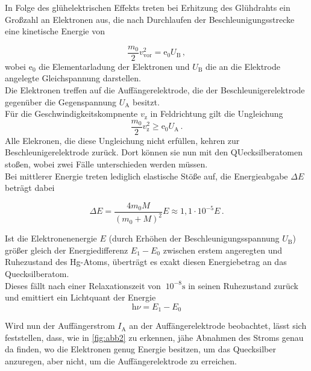 In Folge des glühelektrischen Effekts treten bei Erhitzung des Glühdrahts
ein Großzahl an Elektronen aus, die nach Durchlaufen der Beschleunigungsstrecke
eine kinetische Energie von

\begin{equation*}
    \dfrac{m_0}{2} v^2_\text{vor} = \text{e}_0 U_\text{B} \,,
\end{equation*}
wobei $\text{e}_0$ die Elementarladung der Elektronen und $U_\text{B}$
die an die Elektrode angelegte Gleichspannung darstellen. \\

Die Elektronen treffen auf die Auffängerelektrode, die der Beschleunigerelektrode gegenüber
die Gegenspannung $U_\text{A}$ besitzt. \\

Für die Geschwindigkeitskompnente $v_\text{z}$ in Feldrichtung gilt die Ungleichung
\begin{equation*}
    \dfrac{m_0}{2} v^2_\text{z} \geq \text{e}_0 U_\text{A} \,.
\end{equation*}
Alle Elekronen, die diese Ungleichung nicht erfüllen, kehren zur Beschleunigerelektrode zurück.
Dort können sie nun mit den QUecksilberatomen stoßen, wobei zwei Fälle unterschieden werden müssen. \\

Bei mittlerer Energie treten lediglich elastische Stöße auf, die
Energieabgabe $\Delta E$ beträgt dabei

\begin{equation*}
    \Delta E = \frac{4 m_0 M}{(m_0 + M)^2} E \approx 1,1 \cdot 10^{-5} E \,.
\end{equation*}

Ist die Elektronenenergie $E$ (durch Erhöhen der Beschleunigungsspannung $U_\text{B}$)
größer gleich der Energiedifferenz $E_1 - E_0$ zwischen erstem angeregten und Ruhezustand
des Hg-Atoms, überträgt es exakt diesen Energiebetrag an das Quecksilberatom. \\

Dieses fällt nach einer Relaxationszeit von $~10^{-8} \unit{\second}$
in seinen Ruhezustand zurück und emittiert ein Lichtquant der Energie
\begin{equation*}
    \text{h} \nu = E_1 - E_0
\end{equation*}

Wird nun der Auffängerstrom $I_\text{A}$ an der Auffängerelektrode
beobachtet, lässt sich feststellen, dass, wie in \autoref{fig:abb2} zu erkennen,
jähe Abnahmen des Stroms genau da finden, wo die Elektronen genug Energie besitzen,
um das Quecksilber anzuregen, aber nicht, um die Auffängerelektrode zu erreichen. \\

